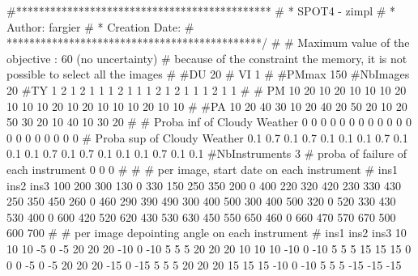 #*********************************************
# * SPOT4 - zimpl
# * Author: fargier
# * Creation Date:
#  *********************************************/
#
# Maximum value of the objective : 60 (no uncertainty)
# because of the constraint the memory, it is not possible to select all the images
#
#DU
20
# VI
1
#
#PMmax
150
#NbImages
20
#TY
1
2
1
2
1
1
1
2
1
1
1
2
1
2
1
1
1
2
1
1
#
# PM
10
20
10
20
10
10
10
20
10
10
10
20
10
20
10
10
10
20
10
10
#
#PA
10
20
40
30
10
20
40
20
50
20
10
20
50
30
20
10
40
10
30
20
#
# Proba inf of Cloudy Weather
0
0
0
0
0
0
0
0
0
0
0
0
0
0
0
0
0
0
0
0
# Proba sup of Cloudy Weather
0.1
0.7
0.1
0.7
0.1
0.1
0.1
0.7
0.1
0.1
0.1
0.7
0.1
0.7
0.1
0.1
0.1
0.7
0.1
0.1
#NbInstruments
3
# proba of failure of each instrument
0
0
0
#
#
# per image, start date on each instrument
# ins1 ins2 ins3
100 200 300
130 0 330
150 250 350
200 0 400
220 320 420
230 330 430
250 350 450
260 0 460
290 390 490
300 400 500
300 400 500
320 0 520
330 430 530
400 0 600
420 520 620
430 530 630
450 550 650
460 0 660
470 570 670
500 600 700
#
# per image depointing angle on each instrument
# ins1 ins2 ins3
10 10 10
-5 0 -5
20 20 20
-10 0 -10
5 5 5
20 20 20
10 10 10
-10 0 -10
5 5 5
15 15 15
0 0 0
-5 0 -5
20 20 20
-15 0 -15
5 5 5
20 20 20
15 15 15
-10 0 -10
5 5 5
-15 -15 -15


